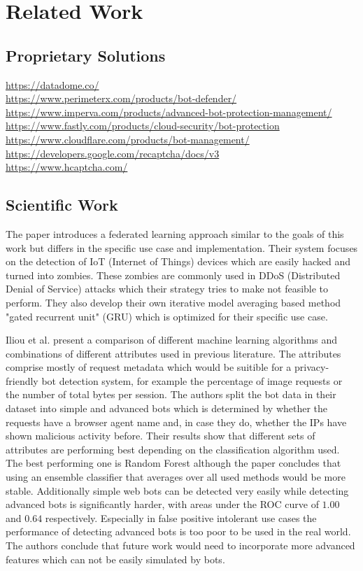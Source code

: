 \documentclass[
    fontsize=12pt,
    headings=small,
    parskip=half,           %
    bibliography=totoc,
    numbers=noenddot,       %
    open=any,               %
    final                   %
    ]{scrreprt}
\begin{document}
\chapter{Related Work}

\section{Proprietary Solutions}

\url{https://datadome.co/} \\
\url{https://www.perimeterx.com/products/bot-defender/} \\
\url{https://www.imperva.com/products/advanced-bot-protection-management/} \\
\url{https://www.fastly.com/products/cloud-security/bot-protection} \\
\url{https://www.cloudflare.com/products/bot-management/} \\
\url{https://developers.google.com/recaptcha/docs/v3} \\
\url{https://www.hcaptcha.com/} \\


\section{Scientific Work}

The paper \cite{LiJi2021} introduces a federated learning approach similar to the goals of this work but differs in the specific use case and implementation. Their system focuses on the detection of IoT (Internet of Things) devices which are easily hacked and turned into zombies. These zombies are commonly used in DDoS (Distributed Denial of Service) attacks which their strategy tries to make not feasible to perform. They also develop their own iterative model averaging based method "gated recurrent unit" (GRU) which is optimized for their specific use case.

Iliou et al. \cite{10.1145/3339252.3339267} present a comparison of different machine learning algorithms and combinations of different attributes used in previous literature. The attributes comprise mostly of request metadata which would be suitible for a privacy-friendly bot detection system, for example the percentage of image requests or the number of total bytes per session. The authors split the bot data in their dataset into simple and advanced bots which is determined by whether the requests have a browser agent name and, in case they do, whether the IPs have shown malicious activity before. Their results show that different sets of attributes are performing best depending on the classification algorithm used. The best performing one is Random Forest although the paper concludes that using an ensemble classifier that averages over all used methods would be more stable. Additionally simple web bots can be detected very easily while detecting advanced bots is significantly harder, with areas under the ROC curve of $1.00$ and $0.64$ respectively. Especially in false positive intolerant use cases the performance of detecting advanced bots is too poor to be used in the real world. The authors conclude that future work would need to incorporate more advanced features which can not be easily simulated by bots.
\end{document}

